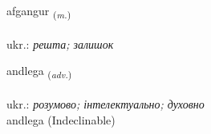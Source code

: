 \documentclass[frontgrid, backgrid]{flacards}\usepackage[]{graphicx}\usepackage[]{xcolor}
\begin{document}
\renewcommand{\flhead}{\vskip5pt \fboxsep=0pt {\small\bfseries\footnotesize Nafnorð | іменник}}
\renewcommand{\fcfoot}{\vskip5pt \fboxsep=0pt \hspace{2pt}{\small\bfseries\footnotesize 3K}}

\renewcommand{\blhead}{\vskip5pt {\small\bfseries\footnotesize Nafnorð | іменник }}
\renewcommand{\bcfoot}{\vskip5pt \hspace{2pt}{\small\bfseries\footnotesize 3K}}


{afgangur \small{\textsubscript{(\textit{m.})}} \\[1ex] %
\textphonetic{[avkauŋkʏr]} \\
ukr.: \emph{решта; залишок} \\  [2ex]
\renewcommand*{\arraystretch}{0.8}
}


\renewcommand{\flhead}{\vskip5pt \fboxsep=0pt {\small\bfseries\footnotesize Atviksorð | прислівник}}
\renewcommand{\fcfoot}{\vskip5pt \fboxsep=0pt \hspace{2pt}{\small\bfseries\footnotesize 3K}}

\renewcommand{\blhead}{\vskip5pt {\small\bfseries\footnotesize Atviksorð | прислівник }}
\renewcommand{\bcfoot}{\vskip5pt \hspace{2pt}{\small\bfseries\footnotesize 3K}}


{andlega \small{\textsubscript{(\textit{adv.})}} \\[1ex]
\textphonetic{[antlɛɣa]} \\
ukr.: \emph{розумово; інтелектуально; духовно} \\  [2ex]
andlega (Indeclinable)}
\end{document}
